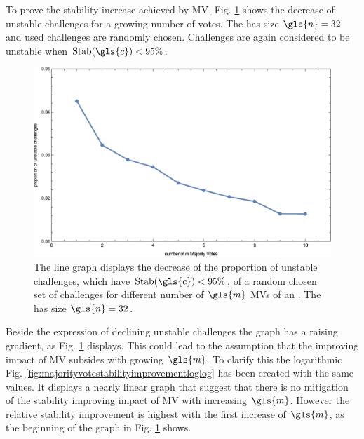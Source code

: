To prove the stability increase achieved by \ac{MV}, Fig. \ref{fig:majorityvotestabilityimprovement} shows the decrease of unstable challenges for a growing number of votes.
The \mpuf has size $\gls{n} = 32$ and used challenges are randomly chosen.
Challenges are again considered to be unstable when $\Stab(\gls{c}) < 95 \%$.

\begin{figure}[ht]
\includegraphics[width=1.00\textwidth]{images/single-votes-stab-simulation.eps}
\caption[Decrease of unstable challenges of a \mpuf]{The line graph displays the decrease of the proportion of unstable challenges, which have $\Stab(\gls{c}) < 95 \%$, of a random chosen set of challenges for different number of $\gls{m}$ \acp{MV} of an \mpuf.
The \mpuf has size $\gls{n} = 32$.
} %
\label{fig:majorityvotestabilityimprovement}
\end{figure}

Beside the expression of declining unstable challenges the graph has a raising gradient, as Fig. \ref{fig:majorityvotestabilityimprovement} displays.
This could lead to the assumption that the improving impact of \ac{MV} subsides with growing $\gls{m}$.
To clarify this the logarithmic Fig. \ref{fig:majorityvotestabilityimprovementloglog} has been created with the same values.
It displays a nearly linear graph that suggest that there is no mitigation of the stability improving impact of \ac{MV} with increasing $\gls{m}$.
However the relative stability improvement is highest with the first increase of $\gls{m}$, as the beginning of the graph in Fig.  \ref{fig:majorityvotestabilityimprovement} shows.

